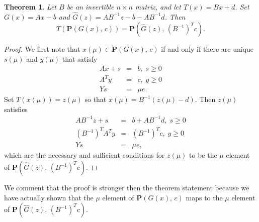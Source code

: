 \documentclass{article}
\newtheorem{theorem}{Theorem}
\def\bP{\mathbf{P}}
\begin{document}
\begin{theorem} \label{thm-affineScaling}
Let $B$ be an invertible $n \times n$ matrix, and let $T(x) = Bx + d$.
Set $G(x) = Ax - b$ and $\hat{G}(z) = AB^{-1} z - b - AB^{-1}d$. Then
\[
T\left(\bP(G(x), \, c)\right) = \bP\left(\hat{G}(z), \, (B^{-1})^Tc\right).
\]
\end{theorem}
\begin{proof}
We first note that $x(\mu) \in \bP(G(x), \, c)$ if and only if
there are unique $s(\mu)$ and $y(\mu)$ that satisfy
\begin{eqnarray*}
Ax + s & = & b, \; s \ge 0 \\
A^T y & = & c, \; y \ge 0 \\
Ys & = & \mu e.
\end{eqnarray*}
Set $T(x(\mu)) = z(\mu)$ so that $x(\mu) = B^{-1}(z(\mu) - d)$. Then
$z(\mu)$ satisfies
\begin{eqnarray*}
AB^{-1}z + s & = & b + AB^{-1}d, \; s \ge 0 \\
(B^{-1})^T A^T y & = & (B^{-1})^T c, \; y \ge 0 \\
Ys & = & \mu e,
\end{eqnarray*}
which are the necessary and sufficient conditions for
$z(\mu)$ to be the $\mu$ element of 
$\bP\left(\hat{G}(z), \, (B^{-1})^Tc\right)$.
\end{proof}
\noindent We comment that the proof is stronger then the theorem
statement because we have actually shown that the $\mu$ element of
$\bP(G(x), \, c)$ maps to the $\mu$ element of
$\bP\left(\hat{G}(z), \, (B^{-1})^Tc\right)$. 
\end{document}
